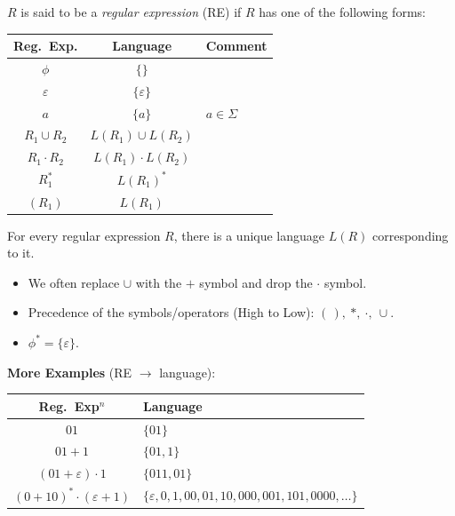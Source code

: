 \begin{greybox}
\begin{definition}
$R$ is said to be a \emph{regular expression} (RE) if $R$ has one of the following forms:
\begin{center}
\begin{tabular}{c|c|l}
Reg.\ Exp. & Language & Comment \\ \hline
$\phi$ & $\{\}$ & \\
$\varepsilon$ & $\{\varepsilon\}$ & \\
$a$ & $\{a\}$ & $a \in \Sigma$ \\
$R_1 \cup R_2$ & $L(R_1) \cup L(R_2)$ & \\
$R_1 \cdot R_2$ & $L(R_1) \cdot L(R_2)$ & \\
$R_1^*$ & $L(R_1)^*$ & \\
$(R_1)$ & $L(R_1)$ &
\end{tabular}
\end{center}
\end{definition}
\end{greybox}

\begin{greybox}
\begin{remark}
For every regular expression $R$, there is a unique language $L(R)$ corresponding to it.
\end{remark}
\end{greybox}

\begin{itemize}
    \item We often replace $\cup$ with the $+$ symbol and drop the $\cdot$ symbol.
    \item Precedence of the symbols/operators (High to Low): $(\,), \ *,\ \cdot,\ \cup$.
    \item $\phi^* = \{\varepsilon\}$.
\end{itemize}

\noindent\textbf{More Examples} (RE $\to$ language):
\begin{center}
\begin{tabular}{c|l}
Reg.\ Exp$^n$ & Language \\ \hline
$01$ & $\{01\}$ \\
$01 + 1$ & $\{01, 1\}$ \\
$(01 + \varepsilon) \cdot 1$ & $\{011, 01\}$ \\
$(0 + 10)^* \cdot (\varepsilon + 1)$ & $\{\varepsilon, 0, 1, 00, 01, 10, 000, 001, 101, 0000, \dots\}$
\end{tabular}
\end{center}

